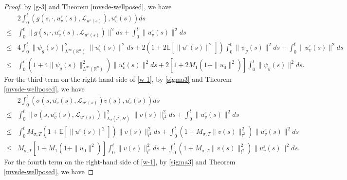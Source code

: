 \documentclass[11pt]{article}
\numberwithin{equation}{section}
\theoremstyle{plain}
\def\leq{\leqslant}
\begin{document}
\begin{proof}
    by \eqref{g-3} and Theorem \ref{mvsde-wellposed}, we have
    \begin{align}\label{w-3}
        & 2 \int_{0}^{t}
        \left( g(s, \cdot, u_v^\varepsilon(s), \mathcal{L}_{u^\varepsilon(s)} ), u_v^\varepsilon(s) \right) ds
        \nonumber \\
        \leq & \int_{0}^{t} \| g(s, \cdot, u_v^\varepsilon(s), \mathcal{L}_{u^\varepsilon(s)} ) \|^2 ds
        + \int_{0}^{t} \| u_v^\varepsilon(s) \|^2 ds
        \nonumber \\
        \leq  & 4 \int_{0}^{t} \| \psi_g(s) \|_{L^\infty(\mathbb{R}^n) }^2
        \|  u_v^\varepsilon(s) \|^2
        ds
        + 2 (1+ 2
        \mathbb{E}\left[ \| u^\varepsilon(s) \|^2 \right]
        )
        \int_{0}^{t} \| \psi_g(s) \|^2 ds
        + \int_{0}^{t} \| u_v^\varepsilon(s) \|^2 ds
        \nonumber \\
        \leq & \int_{0}^{t} \left( 1 + 4 \| \psi_g (s) \|_{L^\infty(\mathbb{R}^n)}^2 \right) \| u_v^\varepsilon(s) \|^2 ds
        + 2 \left[ 1 + 2 M_1 ( 1 + \| u_0 \|^2) \right]
        \int_{0}^{t} \| \psi_g (s) \|^2 ds                        .
    \end{align}
    For the third term on the right-hand side of \eqref{w-1},
    by \eqref{sigma3} and Theorem \ref{mvsde-wellposed}, we have
    \begin{align}\label{w-4}
        & 2 \int_{0}^{t}
        \left( \sigma(s, u_v^\varepsilon (s), \mathcal{L}_{u^\varepsilon(s)} ) v(s),
        u_v^\varepsilon (s)
        \right) ds
        \nonumber \\
        \leq & \int_{0}^{t}
        \| \sigma(s, u_v^\varepsilon (s), \mathcal{L}_{u^\varepsilon(s)} ) \|_{L_2(l^2, H)}^2
        \| v(s) \|_{l^2}^2
        ds
        + \int_0^t \| u_v^\varepsilon (s) \|^2 ds
        \nonumber \\
        \leq
        & \int_{0}^{t}
        M_{\sigma,T} \left( 1  + \mathbb{E}\left[ \| u^\varepsilon(s) \|^2 \right] \right)
        \| v(s) \|_{l^2}^2
        ds
        + \int_0^t
        \left( 1 + M_{\sigma,T} \| v(s) \|_{l^2}^2 \right)
        \| u_v^\varepsilon (s) \|^2 ds  \nonumber \\
        \leq
        & M_{\sigma,T} \left[ 1 + M_1( 1 + \| u_0 \|^2 ) \right]
        \int_{0}^{t} \| v(s) \|_{l^2}^2 ds
        + \int_0^t
        \left( 1 + M_{\sigma,T} \| v(s) \|_{l^2}^2 \right)
        \| u_v^\varepsilon (s) \|^2 ds.
    \end{align}
    For the fourth term on the right-hand side of \eqref{w-1},
    by \eqref{sigma3} and Theorem \ref{mvsde-wellposed}, we have

\end{proof}
\end{document}
